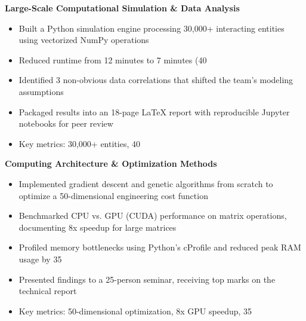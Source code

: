 \documentclass[11pt,a4paper]{article}
\begin{document}
\textbf{ Large-Scale Computational Simulation & Data Analysis }
\begin{itemize}[leftmargin=*,nosep,topsep=2pt]
    
    \item Built a Python simulation engine processing 30,000+ interacting entities using vectorized NumPy operations
    
    \item Reduced runtime from 12 minutes to 7 minutes (40%
    
    \item Identified 3 non-obvious data correlations that shifted the team's modeling assumptions
    
    \item Packaged results into an 18-page LaTeX report with reproducible Jupyter notebooks for peer review
    
    \item Key metrics: 30,000+ entities, 40%
    
\end{itemize}

\textbf{ Computing Architecture & Optimization Methods }
\begin{itemize}[leftmargin=*,nosep,topsep=2pt]
    
    \item Implemented gradient descent and genetic algorithms from scratch to optimize a 50-dimensional engineering cost function
    
    \item Benchmarked CPU vs. GPU (CUDA) performance on matrix operations, documenting 8x speedup for large matrices
    
    \item Profiled memory bottlenecks using Python's cProfile and reduced peak RAM usage by 35%
    
    \item Presented findings to a 25-person seminar, receiving top marks on the technical report
    
    \item Key metrics: 50-dimensional optimization, 8x GPU speedup, 35%
    
\end{itemize}
\end{document}
